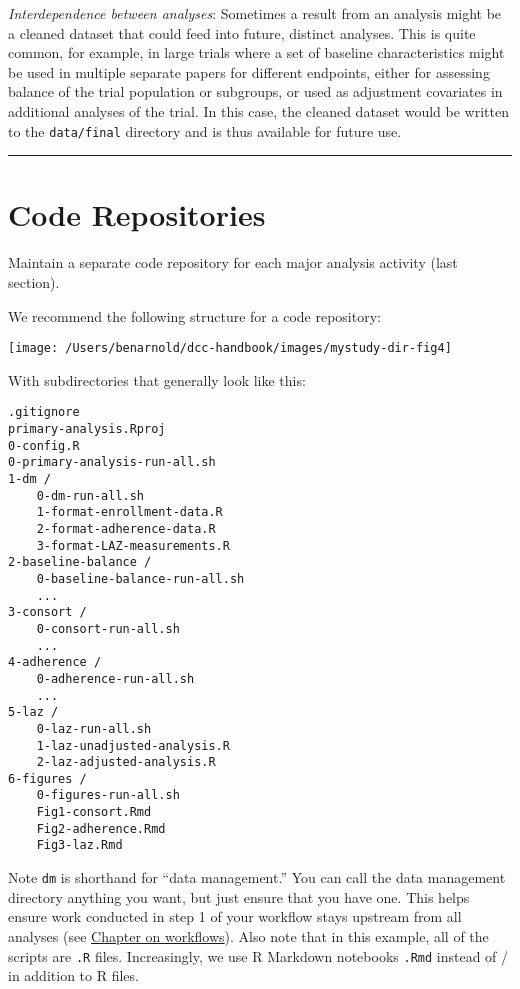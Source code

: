 \documentclass[]{book}
\begin{document}
\emph{Interdependence between analyses}: Sometimes a result from an analysis might be a cleaned dataset that could feed into future, distinct analyses. This is quite common, for example, in large trials where a set of baseline characteristics might be used in multiple separate papers for different endpoints, either for assessing balance of the trial population or subgroups, or used as adjustment covariates in additional analyses of the trial. In this case, the cleaned dataset would be written to the \texttt{data/final} directory and is thus available for future use.

\begin{center}\rule{0.5\linewidth}{\linethickness}\end{center}

\hypertarget{code-repositories}{%
\section{Code Repositories}\label{code-repositories}}

Maintain a separate code repository for each major analysis activity (last section).

We recommend the following structure for a code repository:

\texttt{[image: /Users/benarnold/dcc-handbook/images/mystudy-dir-fig4]}

With subdirectories that generally look like this:

\begin{verbatim}
.gitignore
primary-analysis.Rproj
0-config.R
0-primary-analysis-run-all.sh
1-dm /
    0-dm-run-all.sh
    1-format-enrollment-data.R
    2-format-adherence-data.R
    3-format-LAZ-measurements.R
2-baseline-balance /
    0-baseline-balance-run-all.sh
    ...
3-consort /
    0-consort-run-all.sh
    ...
4-adherence /
    0-adherence-run-all.sh
    ...
5-laz /
    0-laz-run-all.sh
    1-laz-unadjusted-analysis.R
    2-laz-adjusted-analysis.R
6-figures / 
    0-figures-run-all.sh
    Fig1-consort.Rmd
    Fig2-adherence.Rmd
    Fig3-laz.Rmd
\end{verbatim}

Note \texttt{dm} is shorthand for ``data management.'' You can call the data management directory anything you want, but just ensure that you have one. This helps ensure work conducted in step 1 of your workflow stays upstream from all analyses (see \protect\hyperlink{workflows}{Chapter on workflows}). Also note that in this example, all of the scripts are \texttt{.R} files. Increasingly, we use R Markdown notebooks \texttt{.Rmd} instead of / in addition to R files.
\end{document}

